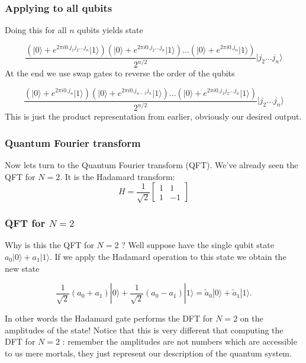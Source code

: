 \documentclass{beamer}
\begin{document}
\begin{frame}
\frametitle{Applying to all qubits}

Doing this for all $n$ qubits yields state

\[
\frac{\left(\vert 0 \rangle + e^{2\pi i 0.j_1j_2\dots j_n}\vert 1\rangle\right)\left(\vert 0 \rangle + e^{2\pi i 0.j_2\dots j_n}\vert 1\rangle\right)\dots \left(\vert 0 \rangle + e^{2\pi i 0.j_n}\vert 1\rangle\right)}{2^{n/2}} \vert j_2 \dots j_n\rangle
\]
At the end we use swap gates to reverse the order of the qubits

\[
\frac{\left(\vert 0 \rangle + e^{2\pi i 0.j_n}\vert 1\rangle\right)\left(\vert 0 \rangle + e^{2\pi i 0.j_{n-1}j_n}\vert 1\rangle\right)\dots\left(\vert 0 \rangle + e^{2\pi i 0.j_1j_2\dots j_n}\vert 1\rangle\right) }{2^{n/2}} \vert j_2 \dots j_n\rangle
\]
This is just the product representation from earlier, obviously our desired output.
\end{frame}

\begin{frame}
\frametitle{Quantum Fourier transform}

Now lets turn to the Quantum Fourier transform (QFT). We've already
seen the QFT for $N=2$. It is the Hadamard transform:
\[
H=\frac{1}{\sqrt{2}}\left[\begin{array}{cc}
1 & 1  \\
1 & -1
\end{array}\right]
\]
\end{frame}

\begin{frame}
\frametitle{QFT for $N=2$}

Why is this the QFT for $N=2$ ? Well suppose have the single qubit
state $a_{0}|0\rangle+a_{1}|1\rangle$. If we apply the Hadamard
operation to this state we obtain the new state

\begin{equation*}
\frac{1}{\sqrt{2}}\left(a_{0}+a_{1}\right)|0\rangle+\frac{1}{\sqrt{2}}\left(a_{0}-a_{1}\right)|1\rangle=\tilde{a}_{0}|0\rangle+\tilde{a}_{1}|1\rangle . 
\end{equation*}

In other words the Hadamard gate performs the DFT for $N=2$ on the
amplitudes of the state! Notice that this is very different that
computing the DFT for $N=2$ : remember the amplitudes are not numbers
which are accessible to us mere mortals, they just represent our
description of the quantum system.
\end{frame}
\end{document}
